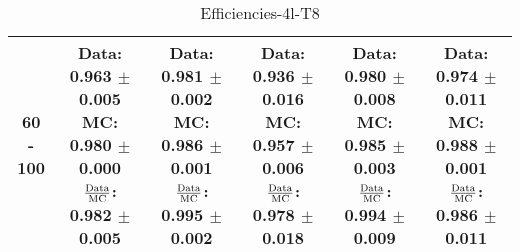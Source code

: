 \documentclass[final,letterpaper,twoside,12pt]{article}
\begin{document}
\begin{table}[htbp]
\begin{adjustwidth}{-4em}{-4em}
\begin{tabular}{|c|c|c|c|c|c|}
60 - 100 & \parbox[c]{1.1 in}{ \scriptsize  Data: 0.963 $\pm$ 0.005 \newline MC: 0.980 $\pm$ 0.000 \newline $\frac{\rm{Data}}{\rm{MC}}$: 0.982 $\pm$ 0.005} & \parbox[c]{1.1 in}{ \scriptsize  Data: 0.981 $\pm$ 0.002 \newline MC: 0.986 $\pm$ 0.001 \newline $\frac{\rm{Data}}{\rm{MC}}$: 0.995 $\pm$ 0.002} & \parbox[c]{1.1 in}{ \scriptsize  Data: 0.936 $\pm$ 0.016 \newline MC: 0.957 $\pm$ 0.006 \newline $\frac{\rm{Data}}{\rm{MC}}$: 0.978 $\pm$ 0.018} & \parbox[c]{1.1 in}{ \scriptsize  Data: 0.980 $\pm$ 0.008 \newline MC: 0.985 $\pm$ 0.003 \newline $\frac{\rm{Data}}{\rm{MC}}$: 0.994 $\pm$ 0.009} & \parbox[c]{1.1 in}{ \scriptsize  Data: 0.974 $\pm$ 0.011 \newline MC: 0.988 $\pm$ 0.001 \newline $\frac{\rm{Data}}{\rm{MC}}$: 0.986 $\pm$ 0.011}\\ \hline 
\end{tabular}
\caption {Efficiencies-4l-T8}
\label{tab:cqdata0}
\end{adjustwidth}\end{table}
\end{document}
